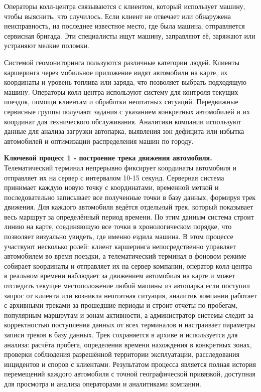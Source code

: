 Операторы колл-центра связываются с клиентом, который использует машину, чтобы выяснить, что случилось. Если клиент не отвечает или обнаружена неисправность, на последнее известное место, где была машина, отправляется сервисная бригада. Эти специалисты ищут машину, заправляют её, заряжают или устраняют мелкие поломки.

Системой геомониторинга пользуются различные категории людей. Клиенты каршеринга через мобильное приложение видят автомобили на карте, их координаты и уровень топлива или заряда, что позволяет выбрать подходящую машину. Операторы колл-центра используют систему для контроля текущих поездок, помощи клиентам и обработки нештатных ситуаций. Передвижные сервисные группы получают задания с указанием конкретных автомобилей и их координат для технического обслуживания. Аналитики компании используют данные для анализа загрузки автопарка, выявления зон дефицита или избытка автомобилей и оптимизации распределения машин по городу.

\textbf{Ключевой процесс 1 - построение трека движения автомобиля.} Телематический терминал непрерывно фиксирует координаты автомобиля и отправляет их на сервер с интервалом 10-15 секунд. Серверная система принимает каждую новую точку с координатами, временной меткой и последовательно записывает все полученные точки в базу данных, формируя трек движения. Для каждого автомобиля ведётся отдельный трек, который показывает весь маршрут за определённый период времени. По этим данным система строит линию на карте, соединяющую все точки в хронологическом порядке, что позволяет визуально увидеть, где именно ездила машина. В этом процессе участвуют несколько ролей: клиент каршеринга непосредственно управляет автомобилем во время поездки, а телематический терминал в фоновом режиме собирает координаты и отправляет их на сервер компании, оператор колл-центра в реальном времени наблюдает за движением автомобиля на карте и может отследить текущее местоположение любой машины из автопарка если поступил запрос от клиента или возникла нештатная ситуация, аналитик компании работает с архивными треками за прошедшие периоды и строит отчёты по пробегам, популярным маршрутам и зонам активности, а администратор системы следит за корректностью поступления данных от всех терминалов и настраивает параметры записи треков в базу данных. Трек сохраняется в архиве и используется для анализа: расчёта пробега, определения времени нахождения в конкретных зонах, проверки соблюдения разрешённой территории эксплуатации, расследования инцидентов и споров с клиентами. Результатом процесса является полная история перемещений каждого автомобиля с точной географической привязкой, доступная для просмотра и анализа операторами и аналитиками компании.

